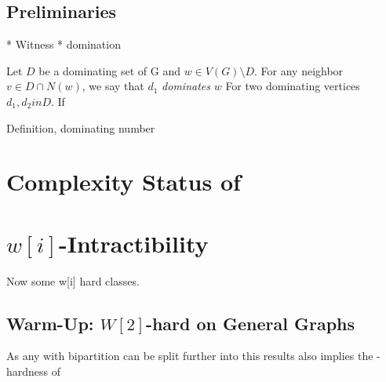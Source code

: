 \subsection{Preliminaries}

* Witness
* domination 

Let $D$ be a dominating set of G and $w \in V(G) \setminus D$. For any neighbor $v \in D \cap N(w)$, we say that $d_1$ \textit{dominates} $w$ For two dominating vertices $d_1, d_2in D$. If 

\sdom



Definition, dominating number

\section{Complexity Status of \sdom}

\section{\hmath $w[i]$-Intractibility}

Now some w[i] hard classes. 

\subsection{Warm-Up: \hmath $W[2]$-hard on General Graphs}


As any \bg with bipartition can be split further into \rpg this results also implies the \wone-hardness of \rpg

